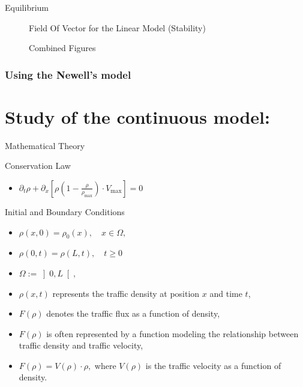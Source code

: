 \documentclass{beamer}
\begin{document}
\begin{frame}{Equilibrium}
\begin{figure}[H]
\begin{minipage}[t]{0.45\textwidth}
			\caption{Field Of Vector for the Linear Model (Stability)}
			\label{fig:FV1}
		\end{minipage}
		\caption{Combined Figures}
		\label{fig:CombinedFigures}
	\end{figure}
\end{frame}



\subsubsection{Using the Newell's model}
\section{Study of the continuous model:}
\begin{frame}{Mathematical Theory}
	\begin{alertblock}{Conservation Law}
		\begin{itemize}
			\item $\partial_t\rho + \partial_x\left[ \rho\left( 1-\frac{\rho}{\rho_{\text{max}}}\right) \cdot V_{\text{max}}\right] = 0 $
		\end{itemize}
	\end{alertblock}
	\begin{block}{Initial and Boundary Conditions}
		\begin{itemize}
			\item $\rho(x,0) = \rho_0(x), \quad x \in \Omega,$
			\item $\rho(0,t) = \rho(L,t), \quad t \geq 0$
			\item $\Omega := \left] 0,L\right[, $
			\item $\rho(x,t)$ represents the traffic density at position $x$ and time $t$, 
			\item $F(\rho)$ denotes the traffic flux as a function of density,
			\item $F(\rho)$ is often represented by a function modeling the relationship between traffic density and traffic velocity,
			\item $F(\rho) = V(\rho) \cdot \rho,$ where $V(\rho)$ is the traffic velocity as a function of density.
		\end{itemize}
	\end{block}
\end{frame}
\end{document}
